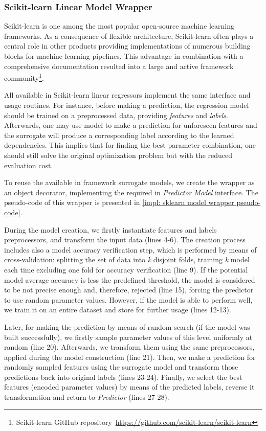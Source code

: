 \subsubsection{Scikit-learn Linear Model Wrapper}\label{impl: sklearn wrapper}
Scikit-learn is one among the most popular open-source machine learning frameworks. As a consequence of flexible architecture, Scikit-learn often plays a central role in other products providing implementations of numerous building blocks for machine learning pipelines. This advantage in combination with a comprehensive documentation resulted into a large and active framework community\footnote{Scikit-learn GitHub repository~\url{https://github.com/scikit-learn/scikit-learn}}.

All available in Scikit-learn linear regressors implement the same interface and usage routines. For instance, before making a prediction, the regression model should be trained on a preprocessed data, providing \emph{features} and \emph{labels}. Afterwards, one may use model to make a prediction for unforeseen features and the surrogate will produce a corresponding label according to the learned dependencies. This implies that for finding the best parameter combination, one should still solve the original optimization problem but with the reduced evaluation cost.

To reuse the available in framework surrogate models, we create the wrapper as an object decorator, implementing the required in \emph{Predictor} \emph{Model} interface. The pseudo-code of this wrapper is presented in \cref{impl: sklearn model wrapper pseudo-code}.

During the model creation, we firstly instantiate features and labels preprocessors, and transform the input data (lines 4-6). The creation process includes also a model accuracy verification step, which is performed by means of cross-validation: splitting the set of data into \textit{k} disjoint folds, training \textit{k} model each time excluding one fold for accuracy verification (line 9). If the potential model average accuracy is less the predefined threshold, the model is considered to be not precise enough and, therefore, rejected (line 15), forcing the predictor to use random parameter values. However, if the model is able to perform well, we train it on an entire dataset and store for further usage (lines 12-13).

Later, for making the prediction by means of random search (if the model was built successfully), we firstly sample parameter values of this level uniformly at random (line 20). Afterwards, we transform them using the same preprocessors, applied during the model construction (line 21). Then, we make a prediction for randomly sampled features using the surrogate model and transform those predictions back into original labels (lines 23-24). Finally, we select the best features (encoded parameter values) by means of the predicted labels, reverse it transformation and return to \emph{Predictor} (lines 27-28).

